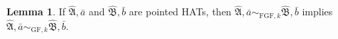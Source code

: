 \documentclass[draft]{scrartcl}
\theoremstyle{definition}
\newtheorem{lemma}[theorem]{Lemma}
\begin{document}



\begin{lemma}
If $\mathfrak{\hat{A}}, \bar{a}$ and $\mathfrak{\hat{B}}, \bar{b}$ are pointed HATs, then $\mathfrak{\hat{A}}, \bar{a} \sim_{\mathrm{FGF},k} \mathfrak{\hat{B}}, \bar{b}$ implies $\mathfrak{\hat{A}}, \bar{a} \sim_{\mathrm{GF},k} \mathfrak{\hat{B}}, \bar{b}$.
\end{lemma}
\end{document}
